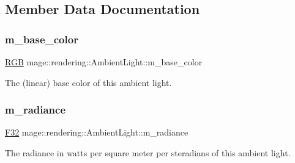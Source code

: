 \subsection{Member Data Documentation}
\hypertarget{classmage_1_1rendering_1_1_ambient_light_a28527ee932d424f43686c1abe9c0f3ec}{}\label{classmage_1_1rendering_1_1_ambient_light_a28527ee932d424f43686c1abe9c0f3ec} 
\subsubsection{\texorpdfstring{m\+\_\+base\+\_\+color}{m\_base\_color}}
{\footnotesize\ttfamily \hyperlink{structmage_1_1_r_g_b}{R\+GB} mage\+::rendering\+::\+Ambient\+Light\+::m\+\_\+base\+\_\+color\hspace{0.3cm}{\ttfamily [private]}}

The (linear) base color of this ambient light. \hypertarget{classmage_1_1rendering_1_1_ambient_light_adfdafe01958a72df46eeb3c0f5f0d0c4}{}\label{classmage_1_1rendering_1_1_ambient_light_adfdafe01958a72df46eeb3c0f5f0d0c4} 
\subsubsection{\texorpdfstring{m\+\_\+radiance}{m\_radiance}}
{\footnotesize\ttfamily \hyperlink{namespacemage_aa97e833b45f06d60a0a9c4fc22ae02c0}{F32} mage\+::rendering\+::\+Ambient\+Light\+::m\+\_\+radiance\hspace{0.3cm}{\ttfamily [private]}}

The radiance in watts per square meter per steradians of this ambient light. 